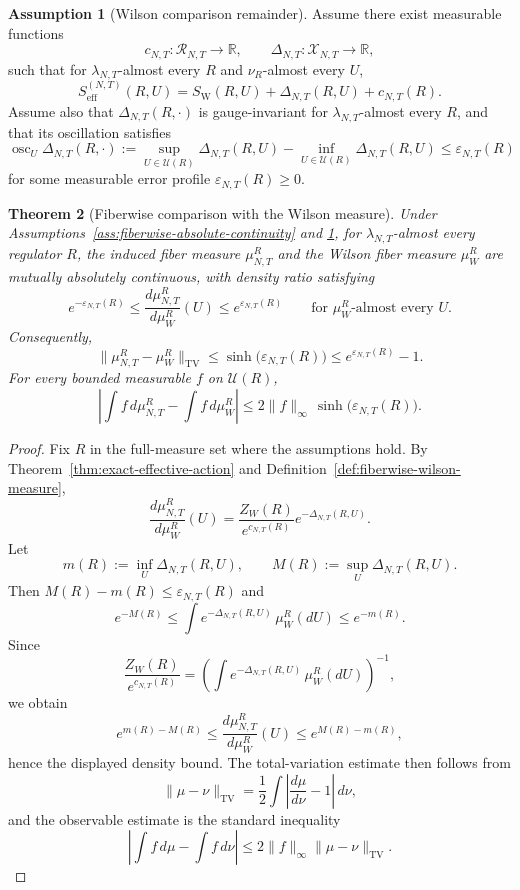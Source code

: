 \documentclass[11pt]{article}
\newtheorem{theorem}{Theorem}[section]
\theoremstyle{definition}
\newtheorem{assumption}[theorem]{Assumption}
\theoremstyle{remark}
\newcommand{\R}{\mathbb R}
\begin{document}
\begin{assumption}[Wilson comparison remainder]
\label{ass:wilson-comparison-remainder}
Assume there exist measurable functions
\[
c_{N,T}:\mathscr R_{N,T}\to\R,
\qquad
\Delta_{N,T}:\mathscr X_{N,T}\to\R,
\]
such that for \(\lambda_{N,T}\)-almost every \(R\) and \(\nu_R\)-almost every
\(U\),
\[
S_{\mathrm{eff}}^{(N,T)}(R,U)
=
S_{\mathrm W}(R,U)+\Delta_{N,T}(R,U)+c_{N,T}(R).
\]
Assume also that \(\Delta_{N,T}(R,\cdot)\) is gauge-invariant for
\(\lambda_{N,T}\)-almost every \(R\), and that its oscillation satisfies
\[
\operatorname{osc}_U \Delta_{N,T}(R,\cdot)
:=
\sup_{U\in\mathscr U(R)}\Delta_{N,T}(R,U)
-\inf_{U\in\mathscr U(R)}\Delta_{N,T}(R,U)
\le \varepsilon_{N,T}(R)
\]
for some measurable error profile \(\varepsilon_{N,T}(R)\ge 0\).
\end{assumption}

\begin{theorem}[Fiberwise comparison with the Wilson measure]
\label{thm:fiberwise-wilson-comparison}
Under Assumptions~\ref{ass:fiberwise-absolute-continuity} and
\ref{ass:wilson-comparison-remainder}, for \(\lambda_{N,T}\)-almost every
regulator \(R\), the induced fiber measure \(\mu_{N,T}^R\) and the Wilson fiber
measure \(\mu_W^R\) are mutually absolutely continuous, with density ratio
satisfying
\[
e^{-\varepsilon_{N,T}(R)}
\le
\frac{d\mu_{N,T}^R}{d\mu_W^R}(U)
\le
e^{\varepsilon_{N,T}(R)}
\qquad
\text{for }\mu_W^R\text{-almost every }U.
\]
Consequently,
\[
\|\mu_{N,T}^R-\mu_W^R\|_{\mathrm{TV}}
\le \sinh\!\bigl(\varepsilon_{N,T}(R)\bigr)
\le e^{\varepsilon_{N,T}(R)}-1.
\]
For every bounded measurable \(f\) on \(\mathscr U(R)\),
\[
\left|
\int f\,d\mu_{N,T}^R-\int f\,d\mu_W^R
\right|
\le
2\|f\|_\infty\,\sinh\!\bigl(\varepsilon_{N,T}(R)\bigr).
\]
\end{theorem}

\begin{proof}
Fix \(R\) in the full-measure set where the assumptions hold. By
Theorem~\ref{thm:exact-effective-action} and
Definition~\ref{def:fiberwise-wilson-measure},
\[
\frac{d\mu_{N,T}^R}{d\mu_W^R}(U)
=
\frac{Z_W(R)}{e^{c_{N,T}(R)}}e^{-\Delta_{N,T}(R,U)}.
\]
Let
\[
m(R):=\inf_{U}\Delta_{N,T}(R,U),\qquad
M(R):=\sup_{U}\Delta_{N,T}(R,U).
\]
Then \(M(R)-m(R)\le \varepsilon_{N,T}(R)\) and
\[
e^{-M(R)}
\le
\int e^{-\Delta_{N,T}(R,U)}\,\mu_W^R(dU)
\le
e^{-m(R)}.
\]
Since
\[
\frac{Z_W(R)}{e^{c_{N,T}(R)}}=
\left(
\int e^{-\Delta_{N,T}(R,U)}\,\mu_W^R(dU)
\right)^{-1},
\]
we obtain
\[
e^{m(R)-M(R)}
\le
\frac{d\mu_{N,T}^R}{d\mu_W^R}(U)
\le
e^{M(R)-m(R)},
\]
hence the displayed density bound. The total-variation estimate then follows
from
\[
\|\mu-\nu\|_{\mathrm{TV}}
=
\frac12\int\left|\frac{d\mu}{d\nu}-1\right|\,d\nu,
\]
and the observable estimate is the standard inequality
\[
\left|\int f\,d\mu-\int f\,d\nu\right|
\le 2\|f\|_\infty\|\mu-\nu\|_{\mathrm{TV}}.
\]
\end{proof}
\end{document}
